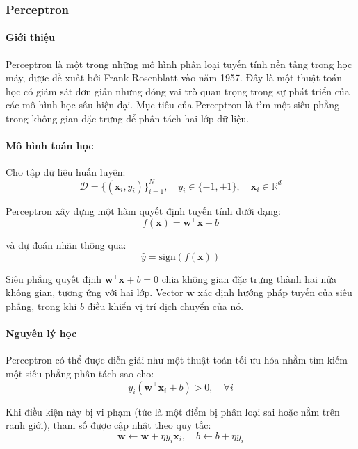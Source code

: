 \subsubsection{Perceptron}

\paragraph{Giới thiệu}

Perceptron là một trong những mô hình phân loại tuyến tính nền tảng trong học máy, được đề xuất bởi Frank Rosenblatt vào năm 1957. Đây là một thuật toán học có giám sát đơn giản nhưng đóng vai trò quan trọng trong sự phát triển của các mô hình học sâu hiện đại. Mục tiêu của Perceptron là tìm một siêu phẳng trong không gian đặc trưng để phân tách hai lớp dữ liệu.

\paragraph{Mô hình toán học}

Cho tập dữ liệu huấn luyện:
\[
\mathcal{D} = \{(\boldsymbol{x}_i, y_i)\}_{i=1}^{N}, \quad y_i \in \{-1, +1\}, \quad \boldsymbol{x}_i \in \mathbb{R}^d
\]

Perceptron xây dựng một hàm quyết định tuyến tính dưới dạng:
\[
f(\boldsymbol{x}) = \boldsymbol{w}^\intercal \boldsymbol{x} + b
\]

và dự đoán nhãn thông qua:
\[
\hat{y} = \text{sign}(f(\boldsymbol{x}))
\]

Siêu phẳng quyết định $\boldsymbol{w}^\intercal \boldsymbol{x} + b = 0$ chia không gian đặc trưng thành hai nửa không gian, tương ứng với hai lớp. Vector $\boldsymbol{w}$ xác định hướng pháp tuyến của siêu phẳng, trong khi $b$ điều khiển vị trí dịch chuyển của nó.

\paragraph{Nguyên lý học}

Perceptron có thể được diễn giải như một thuật toán tối ưu hóa nhằm tìm kiếm một siêu phẳng phân tách sao cho:
\[
y_i (\boldsymbol{w}^\intercal \boldsymbol{x}_i + b) > 0, \quad \forall i
\]

Khi điều kiện này bị vi phạm (tức là một điểm bị phân loại sai hoặc nằm trên ranh giới), tham số được cập nhật theo quy tắc:
\[
\boldsymbol{w} \leftarrow \boldsymbol{w} + \eta y_i \boldsymbol{x}_i, \quad
b \leftarrow b + \eta y_i
\]

